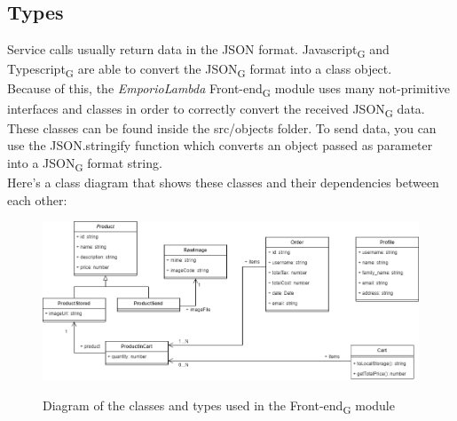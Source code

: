 \subsection{Types}
Service calls usually return data in the JSON format. Javascript\textsubscript{G} and Typescript\textsubscript{G} are able to convert the JSON\textsubscript{G} format into a class object.\\
Because of this, the \textit{EmporioLambda} Front-end\textsubscript{G} module uses many not-primitive interfaces and classes in order to correctly convert the received JSON\textsubscript{G} data. These classes can be found inside the src/objects folder. To send data, you can use the JSON.stringify function which converts an object passed as parameter into a JSON\textsubscript{G} format string.\\Here's a class diagram that shows these classes and their dependencies between each other:
\vspace{0.5cm}
\begin{figure}[H]
\centering
\includegraphics[scale=0.45]{res/Architettura/Frontend/img/class_frontend_types}\\
\caption{Diagram of the classes and types used in the Front-end\textsubscript{G} module}
\end{figure}